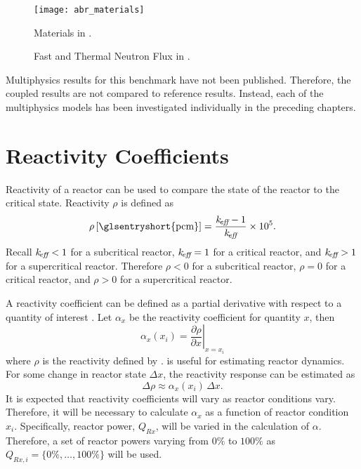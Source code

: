   \begin{figure}
    \centering
    \texttt{[image: abr\_materials]}
    \caption{Materials in .}
    \label{fig:abr_materials}
  \end{figure}

  \begin{figure}
    \centering
    \hspace{0.2in}
    \caption{Fast and Thermal Neutron Flux in .}
    \label{fig:abr_fluxes}
  \end{figure}

  Multiphysics results for this benchmark have not been published. Therefore,
  the coupled results are not compared to reference results. Instead, each of
  the multiphysics models has been investigated individually in the preceding
  chapters. 

\section{Reactivity Coefficients}
\label{sec:reactivity_coefficients}
  Reactivity of a reactor can be used to compare the state of the reactor to the
  critical state. Reactivity $\rho$ is defined as
  \begin{equation}
    \label{eq:reactivity}
    \rho \units{\glsentryshort{pcm}} = \frac{\keff-1}{\keff} \times 10^5.
  \end{equation}
  Recall $k_{\!\mbox{\scriptsize \em eff}} < 1$ for a subcritical reactor, $k_{\!\mbox{\scriptsize \em eff}}=1$ for a critical
  reactor, and $k_{\!\mbox{\scriptsize \em eff}} > 1$ for a supercritical reactor. Therefore $\rho < 0$
  for a subcritical reactor, $\rho = 0$ for a critical reactor, and $\rho > 0$
  for a supercritical reactor. 

  A reactivity coefficient can be defined as a partial derivative with respect
  to a quantity of interest \cite{textbookknief}. Let $\alpha_x$ be the 
  reactivity coefficient for quantity $x$, then
  \begin{equation}
    \label{eq:reactivity_coefficient}
    \alpha_x(x_i) = \left. \frac{\partial \rho}{\partial x} \right|_{x=x_i}
  \end{equation}
  where $\rho$ is the reactivity defined by .
   is useful for estimating reactor dynamics.
  For some change in reactor state $\Delta x$, the reactivity response can be
  estimated as 
  \begin{equation}
    \label{eq:reactivity_estimate}
    \Delta \rho \approx \alpha_x(x_i) \, \Delta x.
  \end{equation}
  It is expected that reactivity coefficients will vary as reactor conditions
  vary. Therefore, it will be necessary to calculate $\alpha_x$ as a function of
  reactor condition $x_i$. Specifically, reactor power, $Q_{Rx}$, will be varied 
  in the calculation of $\alpha$. Therefore, a set of reactor powers varying 
  from $0\%$ to $100\%$ as $Q_{Rx,i} = \{0\%,\ldots,100\%\}$ will be used.

